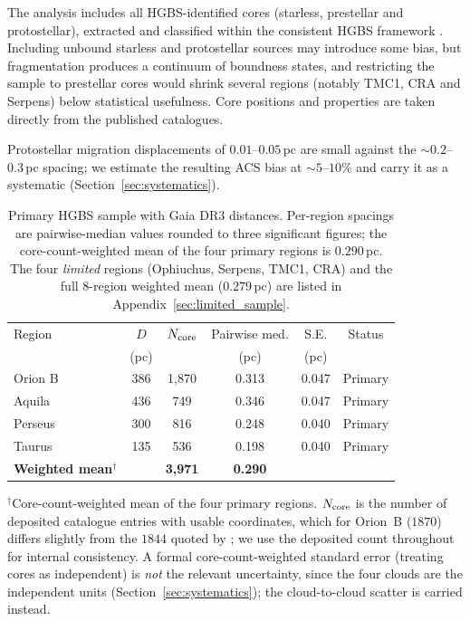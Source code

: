 \documentclass[usenatbib,twoside,twocolumn]{mnras}
\begin{document}
The analysis includes all HGBS-identified cores (starless, prestellar and protostellar), extracted and classified within the consistent HGBS framework \citep{Konyves2015, Konyves2020}. Including unbound starless and protostellar sources may introduce some bias, but fragmentation produces a continuum of boundness states, and restricting the sample to prestellar cores would shrink several regions (notably TMC1, CRA and Serpens) below statistical usefulness. Core positions and properties are taken directly from the published catalogues.

Protostellar migration displacements of $0.01$--$0.05$\,pc \citep{Kirk2016, Mattern2018} are small against the $\sim0.2$--$0.3$\,pc spacing; we estimate the resulting ACS bias at $\sim5$--$10\%$ and carry it as a systematic (Section~\ref{sec:systematics}).




\begin{table}
\caption{Primary HGBS sample with Gaia DR3 distances. Per-region spacings are pairwise-median values rounded to three significant figures; the core-count-weighted mean of the four primary regions is $0.290$\,pc. The four \emph{limited} regions (Ophiuchus, Serpens, TMC1, CRA) and the full 8-region weighted mean ($0.279$\,pc) are listed in Appendix~\ref{sec:limited_sample}.}
\label{tab:sample}
\footnotesize
\setlength{\tabcolsep}{3pt}
\begin{tabular}{lccccc}
\toprule
Region & $D$ & $N_{\rm core}$ & Pairwise med. & S.E. & Status \\
       & (pc) &  & (pc) & (pc) &  \\
\midrule
Orion B  & 386 & 1,870 & 0.313 & 0.047 & Primary \\
Aquila   & 436 & 749   & 0.346 & 0.047 & Primary \\
Perseus  & 300 & 816   & 0.248 & 0.040 & Primary \\
Taurus   & 135 & 536   & 0.198 & 0.040 & Primary \\
\midrule
\textbf{Weighted mean}$^\dagger$ &  & \textbf{3,971} & \textbf{0.290} & &  \\
\bottomrule
\end{tabular}
\par\vspace{2pt}
\footnotesize $^\dagger$Core-count-weighted mean of the four primary regions. $N_{\rm core}$ is the number of deposited catalogue entries with usable coordinates, which for Orion~B ($1870$) differs slightly from the $1844$ quoted by \citet{Konyves2020}; we use the deposited count throughout for internal consistency. A formal core-count-weighted standard error (treating cores as independent) is \emph{not} the relevant uncertainty, since the four clouds are the independent units (Section~\ref{sec:systematics}); the cloud-to-cloud scatter is carried instead.
\end{table}
\end{document}
